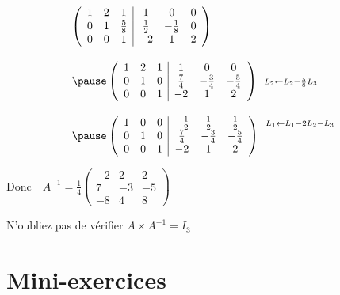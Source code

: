 \begin{frame}
\vspace*{-2ex}
$$
\begin{array}{l}
\left(\begin{array}{ccc|ccc}
1 & 2 & 1 & 1 & 0 & 0\\
0 & 1 & \frac58 & \frac12 & -\frac18 & 0\\
0 & 0 & 1 & -2 & 1 & 2
\end{array}\right)\\[9mm]
%
\pause
\left(\begin{array}{ccc|ccc}
1 & 2 & 1 & 1 & 0 & 0\\
0 & 1 & 0 & \frac{7}{4} & -\frac{3}{4} & -\frac{5}{4}\\
0 & 0 & 1 & -2 & 1 & 2
\end{array}\right)
\begin{array}{l} ~ \\  {\scriptstyle L_2 \leftarrow L_2-\frac{5}{8} L_3} \\ ~ \end{array}\\[9mm]
%
\pause 
\left(\begin{array}{ccc|ccc}
1 & 0 & 0 & -\frac{1}{2} & \frac{1}{2} & \frac{1}{2}\\
0 & 1 & 0 &\frac{7}{4} & -\frac{3}{4} & -\frac{5}{4}\\
0 & 0 & 1 & -2 & 1 & 2
\end{array}\right)
\begin{array}{l}  {\scriptstyle L_1 \leftarrow L_1-2L_2-L_3} \\ ~ \\ ~ \end{array}
\end{array}$$

\medskip
\pause
$\text{Donc}
\quad 
A^{-1} = \displaystyle\frac{1}{4} 
\begin{pmatrix}
-2 & 2 & 2\\
7 & -3 & -5\\
-8 & 4 & 8                       
\end{pmatrix}
$

\medskip\smallskip
\pause
N'oubliez pas de vérifier $A \times A^{-1} = I_3$

\end{frame}


 



\section{Mini-exercices}

